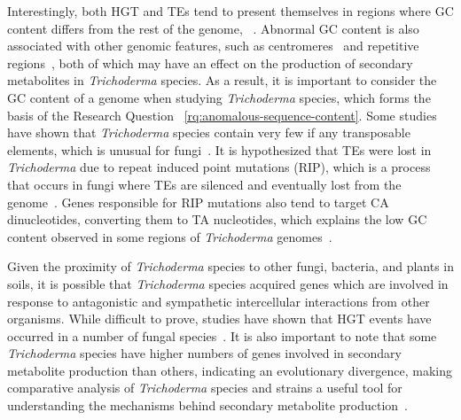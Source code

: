 Interestingly, both HGT and TEs tend to present themselves in regions where GC content differs from the rest of the genome, ~\cite{goncalves2024}. Abnormal GC content is also associated with other genomic features, such as centromeres~\cite{plohl2014a} and repetitive regions~\cite{winter2018}, both of which may have an effect on the production of secondary metabolites in \textit{Trichoderma} species. As a result, it is important to consider the GC content of a genome when studying \textit{Trichoderma} species, which forms the basis of the Research Question ~\ref{rq:anomalous-sequence-content}. Some studies have shown that \textit{Trichoderma} species contain very few if any transposable elements, which is unusual for fungi~\cite{kubicek2011}. It is hypothesized that TEs were lost in \textit{Trichoderma} due to repeat induced point mutations (RIP), which is a process that occurs in fungi where TEs are silenced and eventually lost from the genome~\cite{kubicek2011}. Genes responsible for RIP mutations also tend to target CA dinucleotides, converting them to TA nucleotides, which explains the low GC content observed in some regions of \textit{Trichoderma} genomes~\cite{goncalves2024}.

Given the proximity of \textit{Trichoderma} species to other fungi, bacteria, and plants in soils, it is possible that \textit{Trichoderma} species acquired genes which are involved in response to antagonistic and sympathetic intercellular interactions from other organisms. While difficult to prove, studies have shown that HGT events have occurred in a number of fungal species~\cite{fitzpatrick2012}. It is also important to note that some \textit{Trichoderma} species have higher numbers of genes involved in secondary metabolite production than others, indicating an evolutionary divergence, making comparative analysis of \textit{Trichoderma} species and strains a useful tool for understanding the mechanisms behind secondary metabolite production~\cite{Mukherjee2012}.

